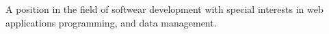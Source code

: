 \documentclass[9pt]{developercv} %
\begin{document}
\vspace{0.5cm}


\begin{minipage}[t]{0.4\textwidth} %

 A position in the field of softwear development with special interests in web applications  programming, and data management.
 
\end{minipage}
\hfill %
\begin{minipage}[t]{0.5\textwidth} %
	\vspace{-\baselineskip} %
	\begin{barchart}{5.5}
	\end{barchart}
\end{minipage}

\begin{center}
\end{center}


\end{document}
